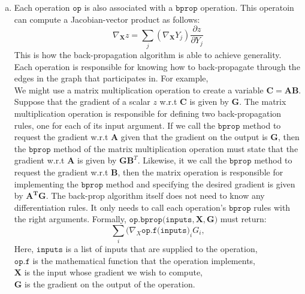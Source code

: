 \documentclass[fleqn]{article}
\begin{document}
\begin{enumerate}[a)]
		\item
		Each operation $\texttt{op}$ is also associated with a $\texttt{bprop}$ operation. This operatoin can 
		compute a Jacobian-vector product as follows:
		\begin{equation*}
			\nabla_{\bm{X}} z = \sum_j (\nabla_{\bm{X}} Y_j) \frac{\partial z}{\partial Y_j}
		\end{equation*}
		This is how the back-propagation algorithm is able to achieve generality. Each operation is 
		responsible for knowing how to back-propagate through the edges in the graph that participates in.
		For example, \hfill \break \\
		We might use a matrix multiplication operation to create a variable $\bm{C} = \bm{AB}$. Suppose that 
		the gradient of a scalar $z$ w.r.t $\bm{C}$ is given by $\bm{G}$. The matrix multiplication operation is 
		responsible for defining two back-propagation rules, one for each of its input argument. If we call the 
		$\texttt{bprop}$ method to request the gradient w.r.t $\bm{A}$ given that the gradient on the output is 
		$\bm{G}$, then the $\texttt{bprop}$ method of the matrix multiplication operation must state that the 
		gradient w.r.t $\bm{A}$ is given by $\bm{GB}^T$. Likewise, it we call the $\texttt{bprop}$ method
		to request the gradient w.r.t $\bm{B}$, then the matrix operation is responsible for implementing the 
		$\texttt{bprop}$ method and specifying the desired gradient is given by $\bm{A^TG}$. The back-prop 
		algorithm itself does not need to know any differentiation rules. It only needs to call each operation's 
		$\texttt{bprop}$ rules with the right arguments. Formally, $\texttt{op.bprop(inputs}, \bm{X}, \bm{G})$
		must return:
		\begin{equation*}
			\sum_i (\nabla_X \texttt{op.f(inputs)}_i G_i,
		\end{equation*}
		Here, $\texttt{inputs}$ is a list of inputs that are supplied to the operation,\\
		$\texttt{op.f}$ is the mathematical function that the operation implements,\\
		$\textbf{X}$ is the input whose gradient we wish to compute,\\
		$\textbf{G}$ is the gradient on the output of the operation.
	
	\end{enumerate}
\end{document}

